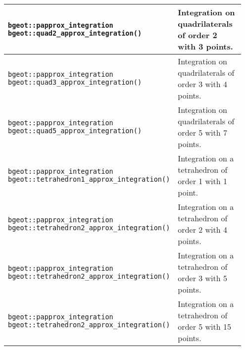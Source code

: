 \begin{center} \begin{tabular}{|m{0.55\linewidth}|m{0.4\linewidth}|} \hline

{\tt bgeot::papprox\_integration bgeot::quad2\_approx\_integration()} & Integration on quadrilaterals of order 2 with 3 points. \\ \hline

{\tt bgeot::papprox\_integration bgeot::quad3\_approx\_integration()} & Integration on quadrilaterals of order 3 with 4 points. \\ \hline

{\tt bgeot::papprox\_integration bgeot::quad5\_approx\_integration()} & Integration on quadrilaterals of order 5 with 7 points. \\ \hline

{\tt bgeot::papprox\_integration bgeot::tetrahedron1\_approx\_integration()} & Integration on a tetrahedron of order 1 with 1 point. \\ \hline

{\tt bgeot::papprox\_integration bgeot::tetrahedron2\_approx\_integration()} & Integration on a tetrahedron of order 2 with 4 points. \\ \hline

{\tt bgeot::papprox\_integration bgeot::tetrahedron2\_approx\_integration()} & Integration on a tetrahedron of order 3 with 5 points. \\ \hline

{\tt bgeot::papprox\_integration bgeot::tetrahedron2\_approx\_integration()} & Integration on a tetrahedron of order 5 with 15 points. \\ \hline

\end{tabular} \end{center}
